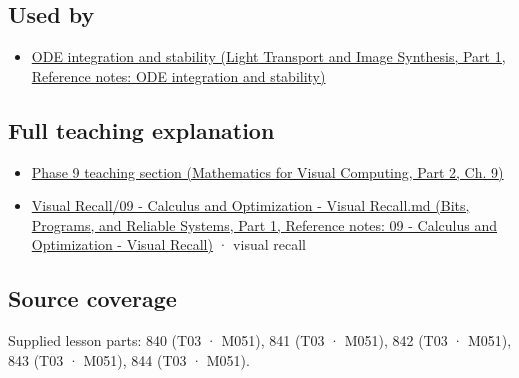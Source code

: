 \subsection{Used by}\label{appendix-8f96f9c4d5bc-used-by}

\hypertarget{appendix-8f96f9c4d5bc-used-by}{}

\begin{itemize}
\tightlist
\item
  \href{../04-Light-Transport-and-Image-Synthesis-P01/main.pdf\#appendix-18eacf61a04b}{ODE integration and stability (Light Transport and Image Synthesis, Part 1, Reference notes: ODE integration and stability)}
\end{itemize}

\subsection{Full teaching explanation}\label{appendix-8f96f9c4d5bc-full-teaching-explanation}

\hypertarget{appendix-8f96f9c4d5bc-full-teaching-explanation}{}

\begin{itemize}
\tightlist
\item
  \href{../02-Mathematics-for-Visual-Computing-P02/main.pdf\#02-foundations-ii-ch025-odes-and-numerical-simulation}{Phase 9 teaching section (Mathematics for Visual Computing, Part 2, Ch. 9)}
\item
  \href{../01-Bits-Programs-and-Reliable-Systems-P01/main.pdf\#appendix-adf48f5dc5c1}{Visual Recall/09 - Calculus and Optimization - Visual Recall.md (Bits, Programs, and Reliable Systems, Part 1, Reference notes: 09 - Calculus and Optimization - Visual Recall)} · visual recall
\end{itemize}

\subsection{Source coverage}\label{appendix-8f96f9c4d5bc-source-coverage}

\hypertarget{appendix-8f96f9c4d5bc-source-coverage}{}

Supplied lesson parts: 840 (T03 · M051), 841 (T03 · M051), 842 (T03 · M051), 843 (T03 · M051), 844 (T03 · M051).
